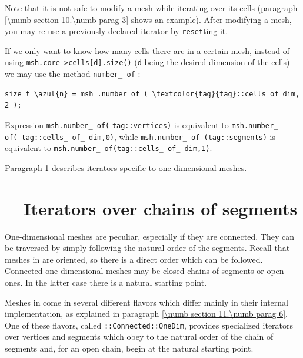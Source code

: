 Note that it is not safe to modify a mesh while iterating over its cells
(paragraph \ref{\numb section 10.\numb parag 3} shows an example).
After modifying a mesh, you may re-use a previously declared iterator by {\small\tt reset}ting it.

If we only want to know how many cells there are in a certain mesh,
instead of using {\small\tt msh.core->cells[d].size()} ({\small\tt d} being the desired
dimension of the cells) we may use the method {\small\tt number\_\,of} :

\begin{Verbatim}[commandchars=\\\{\},formatcom=\small\tt,
   baselinestretch=0.94,framesep=2mm                      ]
   size_t \azul{n} = msh .number_of ( \textcolor{tag}{tag}::cells_of_dim, 2 );
\end{Verbatim}

\noindent Expression {\small\tt msh.number\_\,of}\hskip1pt{\small\tt (}\hskip1pt
{\small\tt \textcolor{tag}{tag}::vertices}\hskip1pt{\small\tt )} is equivalent to
\hbox{{\small\tt msh.number\_\,of}\hskip1pt{\small\tt (}\hskip1pt
{\small\tt \textcolor{tag}{tag}::cells\_\,of\_\,dim,}\hskip1pt{\small\tt 0}\hskip1pt{\small\tt )}},
while {\small\tt msh.number\_\,of}\hskip2pt{\small\tt
(}\hskip2pt{\small\tt \textcolor{tag}{tag}::segments}\hskip2pt{\small\tt )} is equivalent to
{\small\tt msh.number\_\,of}\hskip2pt{\small\tt (}\hskip2pt{\small\tt \textcolor{tag}{tag}::cells\_\,of\_\,dim,}\hskip2pt{\small\tt 1}\hskip2pt{\small\tt )}.

Paragraph \ref{\numb section 9.\numb parag 4} describes iterators specific to one-dimensional
meshes.


\section{~~Iterators over chains of segments}\label{\numb section 9.\numb parag 4}

One-dimensional meshes are peculiar, especially if they are connected.
They can be traversed by simply following the natural order of the segments.
Recall that meshes in {\maniFEM} are oriented, so there is a direct order which can be followed.
Connected one-dimensional meshes may be closed chains of segments or open ones.
In the latter case there is a natural starting point.

Meshes in {\maniFEM} come in several different flavors which differ mainly in their internal
implementation, as explained in paragraph \ref{\numb section 11.\numb parag 6}.
One of these flavors, called {\small\tt {}::Connected::OneDim}, provides specialized iterators
over vertices and segments which obey to the natural order of the chain of segments and,
for an open chain, begin at the natural starting point.

